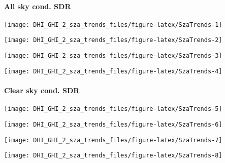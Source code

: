\documentclass[
  10pt,
  a4paper,oneside]{article}
\begin{document}
\newpage

\hypertarget{all-sky-cond.-sdr}{%
\paragraph{All sky cond. SDR}\label{all-sky-cond.-sdr}}

\begin{center}\texttt{[image: DHI\_GHI\_2\_sza\_trends\_files/figure-latex/SzaTrends-1]} \end{center}

\begin{center}\texttt{[image: DHI\_GHI\_2\_sza\_trends\_files/figure-latex/SzaTrends-2]} \end{center}

\begin{center}\texttt{[image: DHI\_GHI\_2\_sza\_trends\_files/figure-latex/SzaTrends-3]} \end{center}

\begin{center}\texttt{[image: DHI\_GHI\_2\_sza\_trends\_files/figure-latex/SzaTrends-4]} \end{center}

\newpage

\hypertarget{clear-sky-cond.-sdr}{%
\paragraph{Clear sky cond. SDR}\label{clear-sky-cond.-sdr}}

\begin{center}\texttt{[image: DHI\_GHI\_2\_sza\_trends\_files/figure-latex/SzaTrends-5]} \end{center}

\begin{center}\texttt{[image: DHI\_GHI\_2\_sza\_trends\_files/figure-latex/SzaTrends-6]} \end{center}

\begin{center}\texttt{[image: DHI\_GHI\_2\_sza\_trends\_files/figure-latex/SzaTrends-7]} \end{center}

\begin{center}\texttt{[image: DHI\_GHI\_2\_sza\_trends\_files/figure-latex/SzaTrends-8]} \end{center}

\newpage
\end{document}
